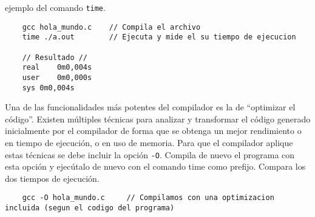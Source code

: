 \documentclass{article}
\begin{document}
ejemplo del comando \verb|time|.

\begin{verbatim}
    gcc hola_mundo.c    // Compila el archivo
    time ./a.out        // Ejecuta y mide el su tiempo de ejecucion

    // Resultado //
    real	0m0,004s
    user	0m0,000s
    sys	0m0,004s

\end{verbatim}

Una de las funcionalidades más potentes del compilador es la de “optimizar el código”. Existen múltiples técnicas para analizar y transformar el código generado inicialmente por el compilador de forma que se obtenga un mejor rendimiento o en tiempo de ejecución, o en uso de memoria. Para que el compilador aplique estas técnicas se debe incluir la opción \verb|-O|. Compila de nuevo el programa con esta opción y ejecútalo de nuevo con el comando time como prefijo. Compara los dos tiempos de ejecución.

\begin{verbatim}
    gcc -O hola_mundo.c     // Compilamos con una optimizacion incluida (segun el codigo del programa)
\end{verbatim}
\end{document}
